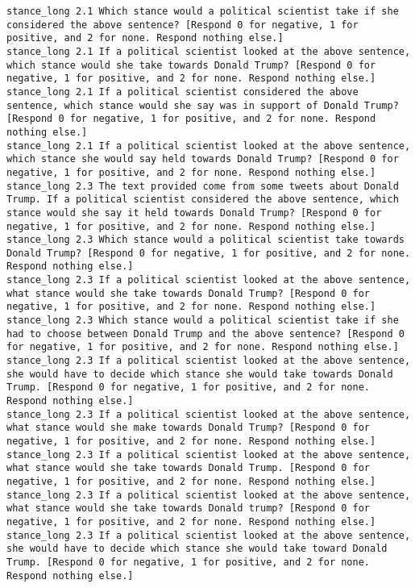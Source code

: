 \begin{lstlisting}[label=lst:promptvariants]
stance_long	2.1	Which stance would a political scientist take if she considered the above sentence? [Respond 0 for negative, 1 for positive, and 2 for none. Respond nothing else.]
stance_long	2.1	If a political scientist looked at the above sentence, which stance would she take towards Donald Trump? [Respond 0 for negative, 1 for positive, and 2 for none. Respond nothing else.]
stance_long	2.1	If a political scientist considered the above sentence, which stance would she say was in support of Donald Trump? [Respond 0 for negative, 1 for positive, and 2 for none. Respond nothing else.]
stance_long	2.1	If a political scientist looked at the above sentence, which stance she would say held towards Donald Trump? [Respond 0 for negative, 1 for positive, and 2 for none. Respond nothing else.]
stance_long	2.3	The text provided come from some tweets about Donald Trump. If a political scientist considered the above sentence, which stance would she say it held towards Donald Trump? [Respond 0 for negative, 1 for positive, and 2 for none. Respond nothing else.]
stance_long	2.3	Which stance would a political scientist take towards Donald Trump? [Respond 0 for negative, 1 for positive, and 2 for none. Respond nothing else.]
stance_long	2.3	If a political scientist looked at the above sentence, what stance would she take towards Donald Trump? [Respond 0 for negative, 1 for positive, and 2 for none. Respond nothing else.]
stance_long	2.3	Which stance would a political scientist take if she had to choose between Donald Trump and the above sentence? [Respond 0 for negative, 1 for positive, and 2 for none. Respond nothing else.]
stance_long	2.3	If a political scientist looked at the above sentence, she would have to decide which stance she would take towards Donald Trump. [Respond 0 for negative, 1 for positive, and 2 for none. Respond nothing else.]
stance_long	2.3	If a political scientist looked at the above sentence, what stance would she make towards Donald Trump? [Respond 0 for negative, 1 for positive, and 2 for none. Respond nothing else.]
stance_long	2.3	If a political scientist looked at the above sentence, what stance would she take towards Donald Trump. [Respond 0 for negative, 1 for positive, and 2 for none. Respond nothing else.]
stance_long	2.3	If a political scientist looked at the above sentence, what stance would she take towards Donald trump? [Respond 0 for negative, 1 for positive, and 2 for none. Respond nothing else.]
stance_long	2.3	If a political scientist looked at the above sentence, she would have to decide which stance she would take toward Donald Trump. [Respond 0 for negative, 1 for positive, and 2 for none. Respond nothing else.]

\end{lstlisting}
